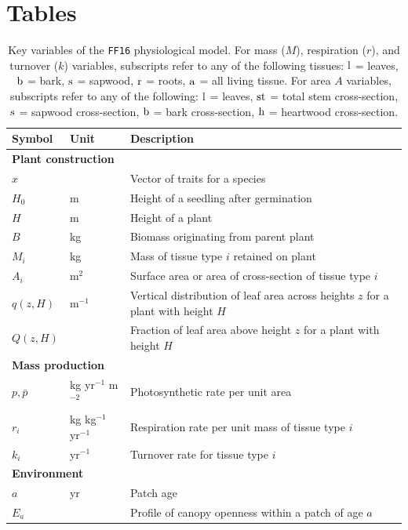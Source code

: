 \documentclass[10pt,twoside]{article}
\begin{document}
\clearpage

\section{Tables}\label{tables}

\begin{table}[h!]
\caption{Key variables of the \texttt{FF16} physiological model. For mass ($M$), respiration ($r$), and turnover ($k$)
variables, subscripts refer to any of the following tissues: \({\rm l}\) = leaves, \({\rm b}\) = bark, \({\rm s}\) = sapwood,
\({\rm r}\) = roots, \({\rm a}\) = all living tissue. For area \(A\) variables, subscripts refer to any of the following: \({\rm l}\) = leaves, \({\rm st}\) = total stem cross-section, \({\rm s}\) = sapwood cross-section, \({\rm b}\) = bark cross-section, \({\rm h}\) = heartwood cross-section.}
\centering
\begin{tabular}{p{2cm}p{2.5cm}p{8cm}}
\hline
Symbol & Unit & Description \\
\hline
\multicolumn{3}{l}{\textbf{Plant construction}} \\
$x$ & & Vector of traits for a species\\
$H_0$ & m & Height of a seedling after germination\\
$H$ & m & Height of a plant\\
$B$ & kg & Biomass originating from parent plant\\
$M_i$ & kg & Mass of tissue type $i$ retained on plant \\
$A_i$ & m$^2$ & Surface area or area of cross-section of tissue type $i$\\
$q(z, H)$ & m$^{-1}$ & Vertical distribution of leaf area across heights $z$ for a plant with height $H$\\
$Q(z, H)$ &  & Fraction of leaf area above height $z$ for a plant with height $H$\\
\multicolumn{3}{l}{\textbf{Mass production}} \\
$p,\bar{p}$ & kg yr$^{-1}$ m$^{-2}$ & Photosynthetic rate per unit area \\
$r_i$ & kg kg$^{-1}$ yr$^{-1}$ & Respiration rate per unit mass of tissue type $i$ \\
$k_i$ & yr$^{-1}$ & Turnover rate for tissue type $i$ \\
\multicolumn{3}{l}{\textbf{Environment}} \\
$a$ & yr& Patch age\\
$E_{a}$ & & Profile of canopy openness within a patch of age $a$\\

\end{tabular}
\end{table}
\end{document}
